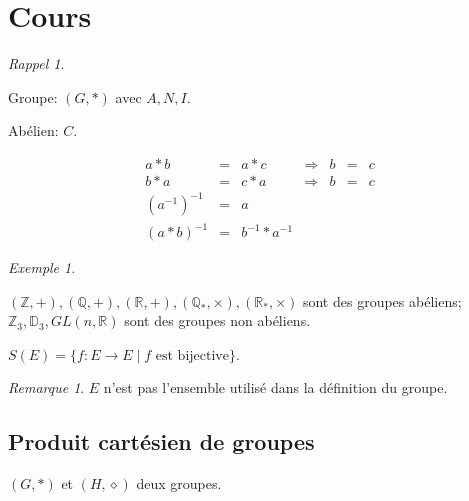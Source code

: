 \documentclass{report}
\newcounter{cours}
\newcommand*{\cours}{\section*{Cours \thecours}\stepcounter{cours}}
\newcommand*{\reels}{\mathbb{R}}
\newcommand*{\entiers}{\mathbb{Z}}
\newcommand*{\rationels}{\mathbb{Q}}
\theoremstyle{definition}
\theoremstyle{remark}
\newtheorem*{exem}{Exemple}
\newtheorem*{rema}{Remarque}
\newtheorem*{rappel}{Rappel}
\begin{document}
	\cours
	\begin{rappel}~

		\begin{ulist}[noitemsep]
			\item Groupe: $(G, *)$ avec $A, N, I$.

			Ab\'elien: $C$.
			\item
			\[
			\begin{array}{rclcrcl}
				a*b&=&a*c&\Rightarrow&b&=&c\\
				b*a&=&c*a&\Rightarrow&b&=&c\\
				(a^{-1})^{-1}&=&a\\
				(a*b)^{-1}&=&b^{-1}*a^{-1}
			\end{array}
			\]
			\item
			\begin{exem}~

				$(\entiers, +), (\rationels, +), (\reels, +), (\rationels_*, \times), (\reels_*, \times)$ sont des groupes ab\'eliens; $\entiers_3, \mathbb{D}_3, GL(n, \reels)$ sont des groupes non ab\'eliens.

				$S(E)=\{f:E \to E \mid f\text{ est bijective}\}$.
				\begin{rema}
					$E$ n'est pas l'ensemble utilis\'e dans la d\'efinition du groupe.
				\end{rema}
			\end{exem}
		\end{ulist}
	\end{rappel}
	\subsection{Produit cart\'esien de groupes}
	$(G, *)$ et $(H, \diamond)$ deux groupes.
\end{document}
